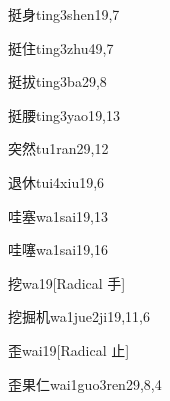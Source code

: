 \begin{verbete}{挺身}{ting3shen1}{9,7}
\end{verbete}

\begin{verbete}{挺住}{ting3zhu4}{9,7}
\end{verbete}

\begin{verbete}{挺拔}{ting3ba2}{9,8}
\end{verbete}

\begin{verbete}{挺腰}{ting3yao1}{9,13}
\end{verbete}

\begin{verbete}{突然}{tu1ran2}{9,12}
\end{verbete}

\begin{verbete}{退休}{tui4xiu1}{9,6}
\end{verbete}

\begin{verbete}{哇塞}{wa1sai1}{9,13}
\end{verbete}

\begin{verbete}{哇噻}{wa1sai1}{9,16}
\end{verbete}

\begin{verbete}{挖}{wa1}{9}[Radical 手]
\end{verbete}

\begin{verbete}{挖掘机}{wa1jue2ji1}{9,11,6}
\end{verbete}

\begin{verbete}{歪}{wai1}{9}[Radical 止]
\end{verbete}

\begin{verbete}{歪果仁}{wai1guo3ren2}{9,8,4}
\end{verbete}

